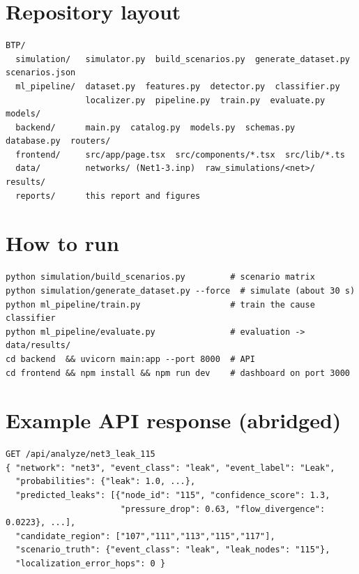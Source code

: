 \documentclass[11pt,a4paper]{article}
\begin{document}
\appendix
\section{Repository layout}\label{app:tree}
\begin{lstlisting}
BTP/
  simulation/   simulator.py  build_scenarios.py  generate_dataset.py  scenarios.json
  ml_pipeline/  dataset.py  features.py  detector.py  classifier.py
                localizer.py  pipeline.py  train.py  evaluate.py  models/
  backend/      main.py  catalog.py  models.py  schemas.py  database.py  routers/
  frontend/     src/app/page.tsx  src/components/*.tsx  src/lib/*.ts
  data/         networks/ (Net1-3.inp)  raw_simulations/<net>/  results/
  reports/      this report and figures
\end{lstlisting}

\section{How to run}
\begin{lstlisting}
python simulation/build_scenarios.py         # scenario matrix
python simulation/generate_dataset.py --force  # simulate (about 30 s)
python ml_pipeline/train.py                  # train the cause classifier
python ml_pipeline/evaluate.py               # evaluation -> data/results/
cd backend  && uvicorn main:app --port 8000  # API
cd frontend && npm install && npm run dev    # dashboard on port 3000
\end{lstlisting}

\section{Example API response (abridged)}
\begin{lstlisting}
GET /api/analyze/net3_leak_115
{ "network": "net3", "event_class": "leak", "event_label": "Leak",
  "probabilities": {"leak": 1.0, ...},
  "predicted_leaks": [{"node_id": "115", "confidence_score": 1.3,
                       "pressure_drop": 0.63, "flow_divergence": 0.0223}, ...],
  "candidate_region": ["107","111","113","115","117"],
  "scenario_truth": {"event_class": "leak", "leak_nodes": "115"},
  "localization_error_hops": 0 }
\end{lstlisting}
\end{document}
